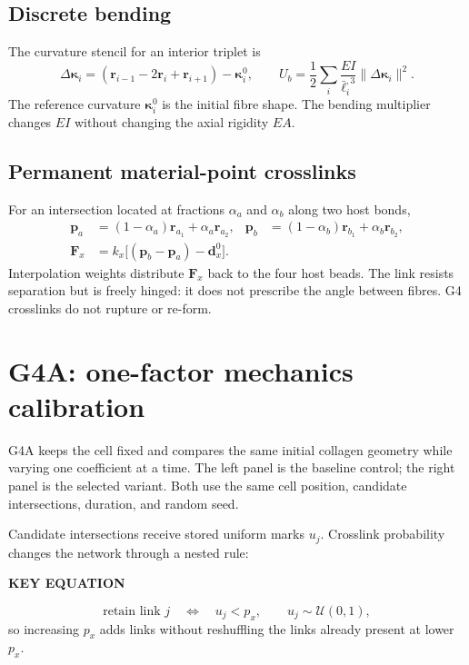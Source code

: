 \documentclass[10.5pt]{article}
\newcommand{\rv}{\mathbf r}
\newcommand{\Fv}{\mathbf F}
\newcommand{\keylabel}{\par\smallskip\noindent\textcolor{g4}{\textbf{KEY EQUATION}}\par\vspace{-5pt}}
\begin{document}
\subsection{Discrete bending}

The curvature stencil for an interior triplet is
\begin{equation}
 \Delta\boldsymbol\kappa_i=
 (\rv_{i-1}-2\rv_i+\rv_{i+1})-\boldsymbol\kappa_i^0,
 \qquad
 U_b=\frac12\sum_i\frac{EI}{\bar\ell_i^{,3}}
 \lVert\Delta\boldsymbol\kappa_i\rVert^2.
 \label{eq:bend}
\end{equation}
The reference curvature $\boldsymbol\kappa_i^0$ is the initial fibre shape. The bending
multiplier changes $EI$ without changing the axial rigidity $EA$.

\subsection{Permanent material-point crosslinks}

For an intersection located at fractions $\alpha_a$ and $\alpha_b$ along two host bonds,
\begin{align}
 \mathbf p_a&=(1-\alpha_a)\rv_{a_1}+\alpha_a\rv_{a_2},
 &\mathbf p_b&=(1-\alpha_b)\rv_{b_1}+\alpha_b\rv_{b_2},\\
 \Fv_x&=k_x\big[(\mathbf p_b-\mathbf p_a)-\mathbf d_x^0\big].
 \label{eq:xlink}
\end{align}
Interpolation weights distribute $\Fv_x$ back to the four host beads. The link resists
separation but is freely hinged: it does not prescribe the angle between fibres. G4 crosslinks
do not rupture or re-form.

\section{G4A: one-factor mechanics calibration}

G4A keeps the cell fixed and compares the same initial collagen geometry while varying one
coefficient at a time. The left panel is the baseline control; the right panel is the selected
variant. Both use the same cell position, candidate intersections, duration, and random seed.

Candidate intersections receive stored uniform marks $u_j$. Crosslink probability changes the
network through a nested rule:
\keylabel
\begin{equation}
 \text{retain link }j \quad\Longleftrightarrow\quad u_j<p_x,
 \qquad u_j\sim\mathcal U(0,1),
 \label{eq:nested}
\end{equation}
so increasing $p_x$ adds links without reshuffling the links already present at lower $p_x$.
\end{document}
